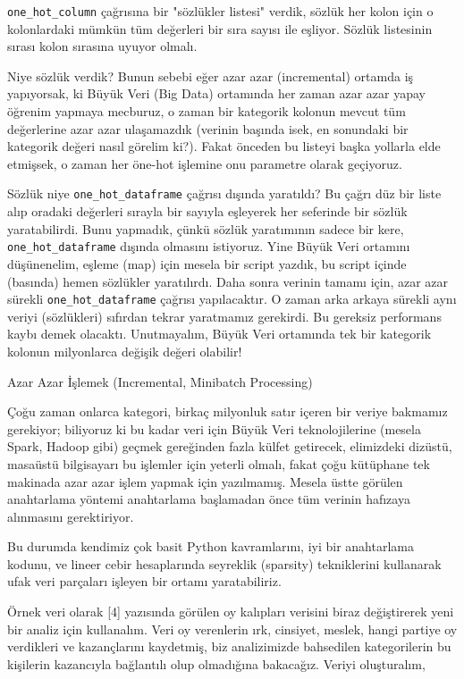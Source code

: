 \documentclass[12pt,fleqn]{article}\usepackage{../../common}
\begin{document}
\verb!one_hot_column! çağrısına bir "sözlükler listesi" verdik, sözlük her
kolon için o kolonlardaki mümkün tüm değerleri bir sıra sayısı ile
eşliyor. Sözlük listesinin sırası kolon sırasına uyuyor olmalı.

Niye sözlük verdik? Bunun sebebi eğer azar azar (incremental) ortamda iş
yapıyorsak, ki Büyük Veri (Big Data) ortamında her zaman azar azar yapay
öğrenim yapmaya mecburuz, o zaman bir kategorik kolonun mevcut tüm
değerlerine azar azar ulaşamazdık (verinin başında isek, en sonundaki bir
kategorik değeri nasıl görelim ki?). Fakat önceden bu listeyi başka
yollarla elde etmişsek, o zaman her öne-hot işlemine onu parametre olarak
geçiyoruz.

Sözlük niye \verb!one_hot_dataframe! çağrısı dışında yaratıldı? Bu çağrı
düz bir liste alıp oradaki değerleri sırayla bir sayıyla eşleyerek her
seferinde bir sözlük yaratabilirdi. Bunu yapmadık, çünkü sözlük yaratımının
sadece bir kere, \verb!one_hot_dataframe! dışında olmasını istiyoruz. Yine
Büyük Veri ortamını düşünenelim, eşleme (map) için mesela bir script
yazdık, bu script içinde (basında) hemen sözlükler yaratılırdı. Daha sonra
verinin tamamı için, azar azar sürekli \verb!one_hot_dataframe! çağrısı
yapılacaktır. O zaman arka arkaya sürekli aynı veriyi (sözlükleri) sıfırdan
tekrar yaratmamız gerekirdi. Bu gereksiz performans kaybı demek
olacaktı. Unutmayalım, Büyük Veri ortamında tek bir kategorik kolonun
milyonlarca değişik değeri olabilir!

Azar Azar İşlemek (Incremental, Minibatch Processing)

Çoğu zaman onlarca kategori, birkaç milyonluk satır içeren bir veriye
bakmamız gerekiyor; biliyoruz ki bu kadar veri için Büyük Veri
teknolojilerine (mesela Spark, Hadoop gibi) geçmek gereğinden fazla külfet
getirecek, elimizdeki dizüstü, masaüstü bilgisayarı bu işlemler için
yeterli olmalı, fakat çoğu kütüphane tek makinada azar azar işlem yapmak
için yazılmamış. Mesela üstte görülen anahtarlama yöntemi anahtarlama
başlamadan önce tüm verinin hafızaya alınmasını gerektiriyor.

Bu durumda kendimiz çok basit Python kavramlarını, iyi bir anahtarlama
kodunu, ve lineer cebir hesaplarında seyreklik (sparsity) tekniklerini
kullanarak ufak veri parçaları işleyen bir ortamı yaratabiliriz.

Örnek veri olarak [4] yazısında görülen oy kalıpları verisini biraz
değiştirerek yeni bir analiz için kullanalım. Veri oy verenlerin ırk,
cinsiyet, meslek, hangi partiye oy verdikleri ve kazançlarını kaydetmiş,
biz analizimizde bahsedilen kategorilerin bu kişilerin kazancıyla
bağlantılı olup olmadığına bakacağız. Veriyi oluşturalım,
\end{document}
